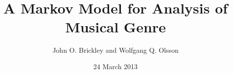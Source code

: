 \documentclass{article}
\title{A Markov Model for Analysis of Musical Genre}
\author{John O. Brickley and Wolfgang Q. Olsson}
\date{24 March 2013}
\begin{document}
 \maketitle


 
 
 

 

 

 

 

 \singlespace
 
 

 
\end{document}
